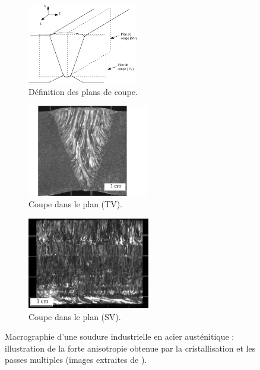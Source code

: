\begin{figure}[!h]
	\hspace{-2cm}
    \centering
    \begin{subfigure}[c]{0.25\textwidth}
    	\centering
        \includegraphics[height=3.5cm]{./img/soudure3.png}
        \vspace{0.03cm}
        \caption{ Définition des plans de coupe.}
    \end{subfigure}
    \hspace{1cm}
    \begin{subfigure}[c]{0.25\textwidth}
    	\centering
        \includegraphics[height=4cm]{./img/soudure1.png}
        \caption{ Coupe dans le plan (TV).}
    \end{subfigure}
        \hspace{1.5cm}
    \begin{subfigure}[c]{0.25\textwidth}
    	\centering
		\includegraphics[height=4cm]{./img/soudure2.png}
        \caption{Coupe dans le plan (SV).}
    \end{subfigure}
    \caption{ Macrographie d'une soudure industrielle en acier austénitique  : illustration de la forte anisotropie obtenue par la cristallisation et les passes multiples (images extraites de \cite{chassignole} ). \label{soudure}}
\end{figure}

